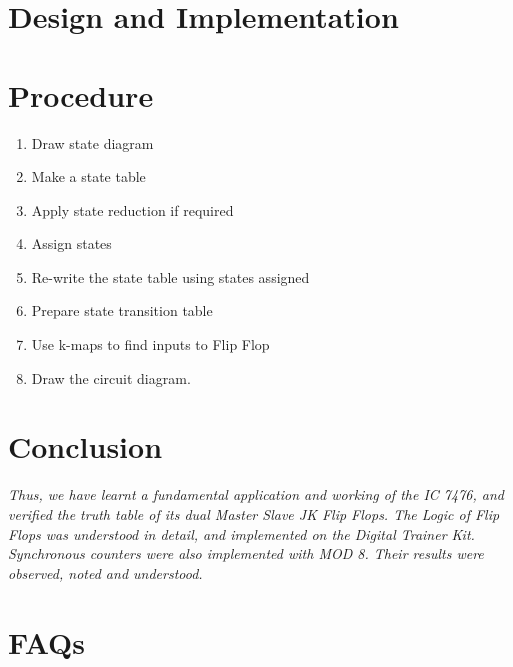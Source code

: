 \documentclass[11pt]{article}
\begin{document}
\section{Design and Implementation}




\section{Procedure}

\begin{enumerate}
	\item Draw state diagram
	\item Make a state table
	\item Apply state reduction if required
	\item Assign states 
	\item Re-write the state table using states assigned
	\item Prepare state transition table
	\item Use k-maps to find inputs to Flip Flop
	\item Draw the circuit diagram.
	
\end{enumerate}

\section{Conclusion}
\textit{Thus, we have learnt a fundamental application and working of the IC 7476, and verified the truth table of its dual Master Slave JK Flip Flops. The Logic of Flip Flops was understood in detail, and implemented on the Digital Trainer Kit. Synchronous counters were also implemented with MOD 8. Their results were observed, noted and understood. }
\pagebreak

\section{FAQs}
\end{document}
